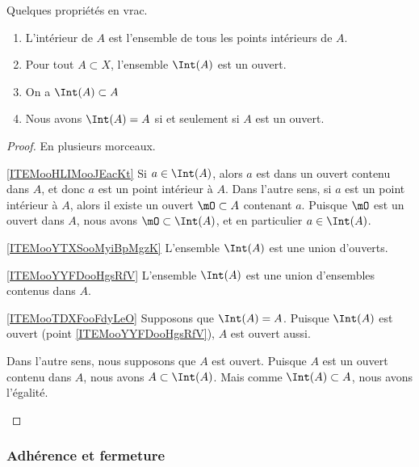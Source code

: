 \begin{lemma}
	Quelques propriétés en vrac.
	\begin{enumerate}
		\item   \label{ITEMooHLIMooJEacKt}
		      L'intérieur de \( A\) est l'ensemble de tous les points intérieurs de \( A\).
		\item \label{ITEMooYTXSooMyiBpMgzK}
		      Pour tout \( A \subset X\), l'ensemble \( \Int(A)\) est un ouvert.
		\item   \label{ITEMooYYFDooHgsRfV}
		      On a  \( \Int(A) \subset A \)
		\item \label{ITEMooTDXFooFdyLeO}
		      Nous avons \( \Int(A) = A \) si et seulement si $A$ est un ouvert.
	\end{enumerate}
\end{lemma}

\begin{proof}
	En plusieurs morceaux.
	\begin{subproof}
		\item[\ref{ITEMooHLIMooJEacKt}]
		Si \( a\in\Int(A)\), alors \( a\) est dans un ouvert contenu dans \( A\), et donc \( a\) est un point intérieur à \( A\). Dans l'autre sens, si \( a\) est un point intérieur à \( A\), alors il existe un ouvert \( \mO\subset A\) contenant \( a\). Puisque \( \mO\) est un ouvert dans \( A\), nous avons \( \mO\subset\Int(A)\), et en particulier \( a\in \Int(A)\).
		\item[\ref{ITEMooYTXSooMyiBpMgzK}]
		L'ensemble \( \Int(A)\) est une union d'ouverts.
		\item[\ref{ITEMooYYFDooHgsRfV}]
		L'ensemble \( \Int(A)\) est une union d'ensembles contenus dans \( A\).
		\item[\ref{ITEMooTDXFooFdyLeO}]
		Supposons que \( \Int(A)=A\). Puisque \( \Int(A)\) est ouvert (point \ref{ITEMooYYFDooHgsRfV}), \( A\) est ouvert aussi.

		Dans l'autre sens, nous supposons que \( A\) est ouvert. Puisque \( A\) est un ouvert contenu dans \( A\), nous avons \( A\subset\Int(A)\). Mais comme \( \Int(A)\subset A\), nous avons l'égalité.
	\end{subproof}
\end{proof}

\subsubsection{Adhérence et fermeture}

